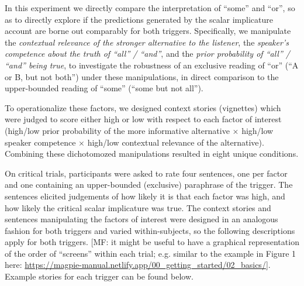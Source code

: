 \documentclass{sp}
\newcommand{\mf}[1]{\textcolor{BurntOrange}{[MF: #1]}}
\begin{document}
In this experiment we directly compare the interpretation of ``some'' and ``or'', so as to directly explore if the predictions generated by the scalar implicature account are borne out comparably for both triggers. Specifically, we manipulate the \textit{contextual relevance of the stronger alternative to the listener}, the \textit{speaker's competence about the truth of ``all'' / ``and''}, and the \textit{prior probability of ``all'' / ``and'' being true}, to investigate the robustness of an exclusive reading of ``or'' (``A or B, but not both'') under these manipulations, in direct comparison to the upper-bounded reading of “some” (``some but not all'').

To operationalize these factors, we designed context stories (vignettes) which were judged to score either high or low with respect to each factor of interest (high/low prior probability of the more informative alternative $\times$ high/low speaker competence $\times$ high/low contextual relevance of the alternative). Combining these dichotomozed manipulations resulted in eight unique conditions. 

On critical trials, participants were asked to rate four sentences, one per factor and one containing an upper-bounded (exclusive) paraphrase of the trigger. The sentences elicited judgements of how likely it is that each factor was high, and how likely the critical scalar implicature was true. The context stories and sentences manipulating the factors of interest were designed in an analogous fashion for both triggers and varied within-subjects, so the following descriptions apply for both triggers.
\mf{it might be useful to have a graphical representation of the order of ``screens'' within each trial; e.g. similar to the example in Figure 1 here: \url{https://magpie-manual.netlify.app/00_getting_started/02_basics/}}. Example stories for each trigger can be found below.
\end{document}
